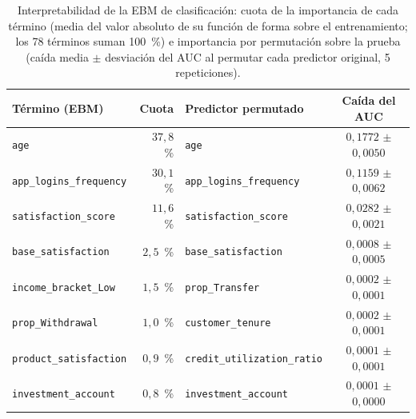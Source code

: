 \begin{table}[tbp]
  \centering\small\setlength{\tabcolsep}{3pt}
  \caption{Interpretabilidad de la EBM de clasificación: cuota de la importancia de cada término (media del valor absoluto de su función de forma sobre el entrenamiento; los 78 términos suman 100~\%) e importancia por permutación sobre la prueba (caída media $\pm$ desviación del AUC al permutar cada predictor original, 5 repeticiones).}
  \label{tab:importancia}
  \begin{tabular}{@{}l r l c@{}}
    \toprule
    Término (EBM) & Cuota & Predictor permutado & Caída del AUC \\
    \midrule
    \texttt{age} & $37{,}8$~\% & \texttt{age} & $0{,}1772$ $\pm$ $0{,}0050$ \\
    \texttt{app\_logins\_frequency} & $30{,}1$~\% & \texttt{app\_logins\_frequency} & $0{,}1159$ $\pm$ $0{,}0062$ \\
    \texttt{satisfaction\_score} & $11{,}6$~\% & \texttt{satisfaction\_score} & $0{,}0282$ $\pm$ $0{,}0021$ \\
    \texttt{base\_satisfaction} & $2{,}5$~\% & \texttt{base\_satisfaction} & $0{,}0008$ $\pm$ $0{,}0005$ \\
    \texttt{income\_bracket\_Low} & $1{,}5$~\% & \texttt{prop\_Transfer} & $0{,}0002$ $\pm$ $0{,}0001$ \\
    \texttt{prop\_Withdrawal} & $1{,}0$~\% & \texttt{customer\_tenure} & $0{,}0002$ $\pm$ $0{,}0001$ \\
    \texttt{product\_satisfaction} & $0{,}9$~\% & \texttt{credit\_utilization\_ratio} & $0{,}0001$ $\pm$ $0{,}0001$ \\
    \texttt{investment\_account} & $0{,}8$~\% & \texttt{investment\_account} & $0{,}0001$ $\pm$ $0{,}0000$ \\
    \bottomrule
  \end{tabular}
\end{table}
